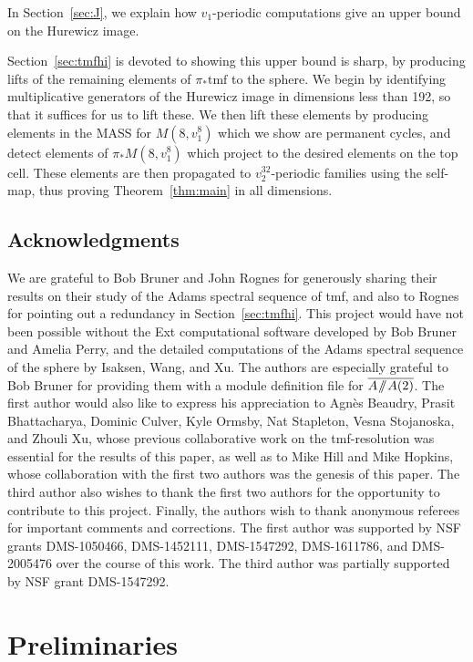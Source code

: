 \documentclass[10pt]{amsart}
\newcommand{\sslash}{\mathbin{/\mkern-6mu/}}
\newcommand{\mmod}{\! \sslash \!}
\newcommand{\br}[1]{\overline{#1}}
\newcommand{\tmf}{\mathrm{tmf}}
\theoremstyle{definition}
\numberwithin{equation}{section}
\numberwithin{figure}{section}
\begin{document}
In Section~\ref{sec:J}, we explain how $v_1$-periodic computations give an upper bound on the Hurewicz image.

Section~\ref{sec:tmfhi} is devoted to showing this upper bound is sharp, by producing lifts of the remaining elements of $\pi_*\tmf$ to the sphere.  We begin by identifying multiplicative generators of the Hurewicz image in dimensions less than 192, so that it suffices for us to lift these.  We then lift these elements by producing elements in the MASS for $M(8,v_1^8)$ which we show are permanent cycles, and detect elements of $\pi_*M(8,v_1^8)$ which project to the desired elements on the top cell.  These elements are then propagated to $v_2^{32}$-periodic families using the self-map, thus proving Theorem~\ref{thm:main} in all dimensions. 

\subsection*{Acknowledgments}

We are grateful to Bob Bruner and John Rognes for generously sharing their results on their study of the Adams spectral sequence of tmf, and also to Rognes for pointing out a redundancy in Section~\ref{sec:tmfhi}.  This project would have not been possible without the Ext computational software developed by Bob Bruner and Amelia Perry, and the detailed computations of the Adams spectral sequence of the sphere by Isaksen, Wang, and Xu.  The authors are especially grateful to Bob Bruner for providing them with a module definition file for $\br{A \mmod A(2)}$.    The first author would also like to express his appreciation to Agn\`es Beaudry, Prasit Bhattacharya, Dominic Culver, Kyle Ormsby, Nat Stapleton, Vesna Stojanoska, and Zhouli Xu, whose previous collaborative work on the tmf-resolution was essential for the results of this paper, as well as to Mike Hill and Mike Hopkins, whose collaboration with the first two authors was the genesis of this paper. The third author also wishes to thank the first two authors for the opportunity to contribute to this project. Finally, the authors wish to thank anonymous referees for important comments and corrections. The first author was supported by NSF grants DMS-1050466, DMS-1452111, DMS-1547292, DMS-1611786, and DMS-2005476 over the course of this work. The third author was partially supported by NSF grant DMS-1547292. 

\section{Preliminaries}\label{sec:preliminaries}
\end{document}
